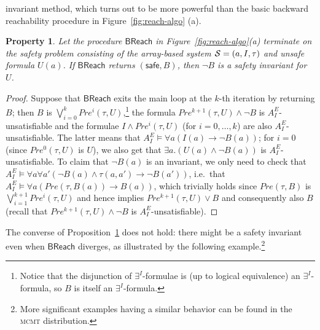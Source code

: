 \documentclass{LMCS}
\newcommand{\cSi}{\ensuremath \mathcal S}
\theoremstyle{plain}\newtheorem{assumption}[thm]{Assumption}
\theoremstyle{plain}\newtheorem{proposition}[thm]{Proposition}
\theoremstyle{plain}\newtheorem{property}[thm]{Property}
\theoremstyle{plain}\newtheorem{example}[thm]{Example}
\theoremstyle{plain}\newtheorem{claim}[thm]{Claim}
\theoremstyle{plain}\newtheorem{lemma}[thm]{Lemma}
\begin{document}
invariant method, which turns out to be more powerful than the basic
backward reachability procedure in Figure~\ref{fig:reach-algo} (a).
\begin{property}
  \label{ex:basic}
  Let the procedure $\mathsf{BReach}$ in Figure~\ref{fig:reach-algo}(a)
  terminate on the safety problem consisting of the array-based system
  $\cSi=(a,I,\tau)$ and unsafe formula $U(a)$.  If $\mathsf{BReach}$
  returns $(\mathsf{safe},B)$, then $\neg B$ is a safety invariant for
  $U$.
\end{property}
\begin{proof}
  Suppose that $\mathsf{BReach}$ exits the main loop at the $k$-th
  iteration by returning $B$; then $B$ is $\bigvee_{i=0}^k Pre^i(\tau,
  U)$,\footnote{Notice that the disjunction of $\exists^I$-formulae is
    (up to logical equivalence) an $\exists^I$-formula, so $B$ is
    itself an $\exists^I$-formula.}  the formula $Pre^{k+1}(\tau,
  U)\wedge \neg B$ is $A^E_I$-unsatisfiable and the formulae $I\wedge
  Pre^i(\tau, U)$ (for $i=0, \dots, k$) are also
  $A^E_I$-unsatisfiable.  The latter means that $A^E_I\models \forall
  a (I(a)\to \neg B(a))$; for $i=0$ (since $Pre^0(\tau, U)$ is $U$),
  we also get that $\exists a.(U(a)\wedge \neg B(a))$ is
  $A_I^E$-unsatisfiable.  To claim that $\neg B(a)$ is an invariant,
  we only need to check that $A^E_I\models \forall a\forall a' (\neg
  B(a)\wedge \tau(a, a')\to \neg B(a'))$, i.e.\ that $A^E_I\models
  \forall a (Pre(\tau,B(a))\to B(a))$, which trivially holds since
$Pre(\tau, B)$ is
$\bigvee_{i=1}^{k+1}Pre^i(\tau,U)$
and hence implies
 $Pre^{k+1}(\tau,U)\vee B$ and consequently also $B$ (recall that
  $Pre^{k+1}(\tau,
  U)\wedge \neg B$ is $A^E_I$-unsatisfiable).
\end{proof}
The converse of Proposition~\ref{ex:basic} does not hold: there might
be a safety invariant even when $\mathsf{BReach}$ diverges, as
illustrated by the following example.\footnote{More significant
  examples having a similar behavior can be found in the \textsc{mcmt}
  distribution.}
\end{document}
